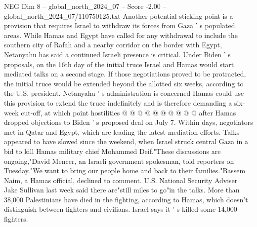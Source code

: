 \begin{textsample}{NEG Dim 8 – global\_north\_2024\_07 – Score -2.00 – global\_north\_2024\_07/110750125.txt}
Another potential sticking point is a provision that requires Israel to withdraw its forces from Gaza ' s populated areas.
While Hamas and Egypt have called for any withdrawal to include the southern city of Rafah and a nearby corridor on the border with Egypt, Netanyahu has said a continued Israeli presence is critical.
Under Biden ' s proposals, on the 16th day of the initial truce Israel and Hamas would start mediated talks on a second stage.
If those negotiations proved to be protracted, the initial truce would be extended beyond the allotted six weeks, according to the U.S. president.
Netanyahu ' s administration is concerned Hamas could use this provision to extend the truce indefinitely and is therefore demanding a six-week cut-off, at which point hostilities @ @ @ @ @ @ @ @ @ @ after Hamas dropped objections to Biden ' s proposed deal on July 7.
Within days, negotiators met in Qatar and Egypt, which are leading the latest mediation efforts.
Talks appeared to have slowed since the weekend, when Israel struck central Gaza in a bid to kill Hamas military chief Mohammed Deif."These discussions are ongoing,"David Mencer, an Israeli government spokesman, told reporters on Tuesday."We want to bring our people home and back to their families."Bassem Naim, a Hamas official, declined to comment.
U.S.
National Security Adviser Jake Sullivan last week said there are"still miles to go"in the talks.
More than 38,000 Palestinians have died in the fighting, according to Hamas, which doesn't distinguish between fighters and civilians.
Israel says it ' s killed some 14,000 fighters.

\end{textsample}
